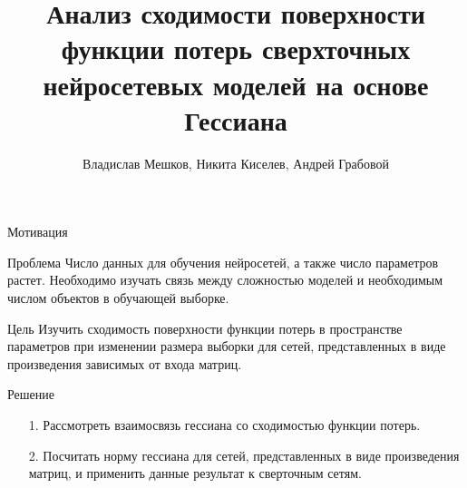 \documentclass[aspectratio=169]{beamer}
\title{Анализ сходимости поверхности функции потерь сверхточных нейросетевых моделей на основе Гессиана}
\author{
    Владислав Мешков, Никита Киселев, Андрей Грабовой\\
}
\date{}
\institute[MIPT]{
    Московский Физико-Технический Институт
}
\begin{document}
\maketitle

\begin{frame}{Мотивация}
    \begin{block}{Проблема}
    Число данных для обучения нейросетей, а также число параметров растет. Необходимо изучать связь между сложностью моделей и необходимым числом объектов в обучающей выборке.
    \end{block}
    \begin{block}{Цель}
    Изучить сходимость поверхности функции потерь в пространстве параметров при изменении размера выборки для сетей, представленных в виде произведения зависимых от входа матриц.
    \end{block}
    \begin{block}{Решение}
        \begin{enumerate}
        \item[1.] Рассмотреть взаимосвязь гессиана со сходимостью функции потерь.
        \item[2.] Посчитать норму гессиана для сетей, представленных в виде произведения матриц, и применить данные результат к сверточным сетям.
        \end{enumerate}
    \end{block}
\end{frame}
\end{document}
